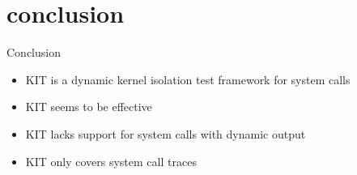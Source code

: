 \section{conclusion}
\begin{frame}{Conclusion}{~}

\begin{itemize}
    \setlength\itemsep{1em}
    \item KIT is a dynamic kernel isolation test framework for system calls
    \item KIT seems to be effective
    \item KIT lacks support for system calls with dynamic output
    \item KIT only covers system call traces 
\end{itemize}


\end{frame}
